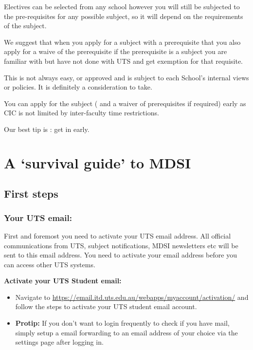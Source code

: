 \documentclass[]{book}
\providecommand{\tightlist}{%
  \setlength{\itemsep}{0pt}\setlength{\parskip}{0pt}}
\theoremstyle{definition}
\theoremstyle{definition}
\theoremstyle{remark}
\begin{document}
Electives can be selected from any school however you will still be
subjected to the pre-requisites for any possible subject, so it will
depend on the requirements of the subject.

We suggest that when you apply for a subject with a prerequisite that
you also apply for a waive of the prerequisite if the prerequisite is a
subject you are familiar with but have not done with UTS and get
exemption for that requisite.

This is not always easy, or approved and is subject to each School's
internal views or policies. It is definitely a consideration to take.

You can apply for the subject ( and a waiver of prerequisites if
required) early as CIC is not limited by inter-faculty time
restrictions.

Our best tip is : get in early.

\chapter{\texorpdfstring{A `survival guide' to
MDSI}{A survival guide to MDSI}}\label{a-survival-guide-to-mdsi}

\section{First steps}\label{first-steps}

\subsection{Your UTS email:}\label{your-uts-email}

First and foremost you need to activate your UTS email address. All
official communications from UTS, subject notifications, MDSI
newsletters etc will be sent to this email address. You need to activate
your email address before you can access other UTS systems.

\textbf{Activate your UTS Student email:}

\begin{itemize}
\tightlist
\item
  Navigate to
  \url{https://email.itd.uts.edu.au/webapps/myaccount/activation/} and
  follow the steps to activate your UTS student email account.
\item
  \textbf{Protip:} If you don't want to login frequently to check if you
  have mail, simply setup a email forwarding to an email address of your
  choice via the settings page after logging in.
\end{itemize}
\end{document}

